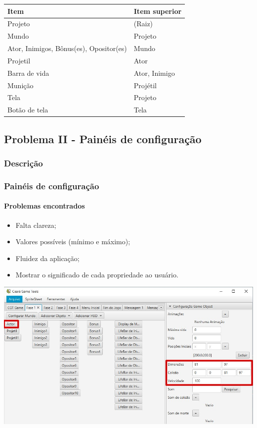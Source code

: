 \documentclass{beamer}
\begin{document}
   \begin{frame}
      \begin{center}
         \begin{tabular}{| p{8cm} | l | }
            \hline
            \textbf{Item} & \textbf{Item superior} \\
            \hline
            Projeto & (Raiz) \\
            Mundo & Projeto \\
            Ator, Inimigos, Bônus(es), Opositor(es) & Mundo \\
            Projetil & Ator \\
            Barra de vida & Ator, Inimigo \\
            Munição & Projétil \\
            Tela & Projeto \\
            Botão de tela & Tela \\
            \hline
         \end{tabular}
      \end{center}
   \end{frame}

   \subsection{Problema II - Painéis de configuração}
   \subsubsection{Descrição}
   \begin{frame}
      \frametitle{Painéis de configuração}
      \framesubtitle{Problemas encontrados}
      \begin{itemize}
         \item Falta clareza;
         \item Valores possíveis (mínimo e máximo);
         \item Fluidez da aplicação;
         \item Mostrar o significado de cada propriedade ao usuário.
      \end{itemize}
   \end{frame}

   \begin{frame}
      \includegraphics[width=\textwidth]{images/obj_dimensoes.jpg}
   \end{frame}
\end{document}
